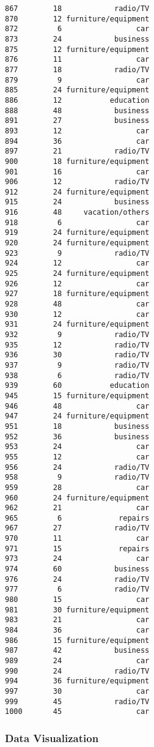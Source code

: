 \documentclass[
]{article}
\begin{document}
\begin{verbatim}
867        18            radio/TV
870        12 furniture/equipment
872         6                 car
873        24            business
875        12 furniture/equipment
876        11                 car
877        18            radio/TV
879         9                 car
885        24 furniture/equipment
886        12           education
888        48            business
891        27            business
893        12                 car
894        36                 car
897        21            radio/TV
900        18 furniture/equipment
901        16                 car
906        12            radio/TV
912        24 furniture/equipment
915        24            business
916        48     vacation/others
918         6                 car
919        24 furniture/equipment
920        24 furniture/equipment
923         9            radio/TV
924        12                 car
925        24 furniture/equipment
926        12                 car
927        18 furniture/equipment
928        48                 car
930        12                 car
931        24 furniture/equipment
932         9            radio/TV
935        12            radio/TV
936        30            radio/TV
937         9            radio/TV
938         6            radio/TV
939        60           education
945        15 furniture/equipment
946        48                 car
947        24 furniture/equipment
951        18            business
952        36            business
953        24                 car
955        12                 car
956        24            radio/TV
958         9            radio/TV
959        28                 car
960        24 furniture/equipment
962        21                 car
965         6             repairs
967        27            radio/TV
970        11                 car
971        15             repairs
973        24                 car
974        60            business
976        24            radio/TV
977         6            radio/TV
980        15                 car
981        30 furniture/equipment
983        21                 car
984        36                 car
986        15 furniture/equipment
987        42            business
989        24                 car
990        24            radio/TV
994        36 furniture/equipment
997        30                 car
999        45            radio/TV
1000       45                 car
\end{verbatim}

\hypertarget{data-visualization}{%
\subsubsection{Data Visualization}\label{data-visualization}}
\end{document}
